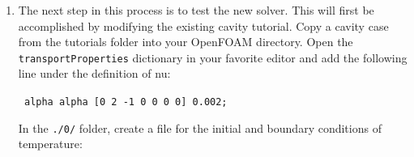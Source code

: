 \documentclass{article}
\newcommand\tab[1][0.5cm]{\hspace*{#1}}
\begin{document}
\begin{enumerate}
\begin{myframe}
{		\tab\tab\tab \#include "continuityErrs.H" \\
		\\
		\tab\tab\tab U -= rUA*fvc::grad(p);\\
		\tab\tab\tab U.correctBoundaryConditions();\\
		\tab\tab \}\\
		\\
		\tab\tab //add these lines...\\
		\tab\tab fvScalarMatrix TEqn\\
		\tab\tab (\\
		\tab\tab\tab fvm::ddt(T)\\
		\tab\tab\tab + fvm::div(phi, T)\\
		\tab\tab\tab - fvm::laplacian(alpha, T)\\
		\tab\tab);\\
		\\
		\tab\tab TEqn.solve();\\
		\tab\tab //done adding lines...\\
		\\
		\tab\tab runTime.write();\\
	}
	\end{myframe}
	
	These lines add a new equation for the temperature and make use of the face flux variable, phi, which is already used in the momentum equation solution.
	
	Save your changes and run wmake to compile the solver: 
		
	{\tt \tab \$ wmake}
	
	
	
	\item The next step in this process is to test the new solver. This will first be accomplished by modifying the existing cavity tutorial. Copy a cavity case from the tutorials folder into your OpenFOAM directory. Open the {\tt transportProperties} dictionary in your favorite editor and add the following line under the definition of nu: 
	
	\begin{myframe}
	{\tt %
	alpha \tab \tab \tab alpha [0 2 -1 0 0 0 0] 0.002;
	}
	\end{myframe}
	
	
	In the {\tt ./0/} folder, create a file for the initial and boundary conditions of temperature:
	
	\begin{myframe}
	{\tt %

}
\end{myframe}
\end{enumerate}
\end{document}
